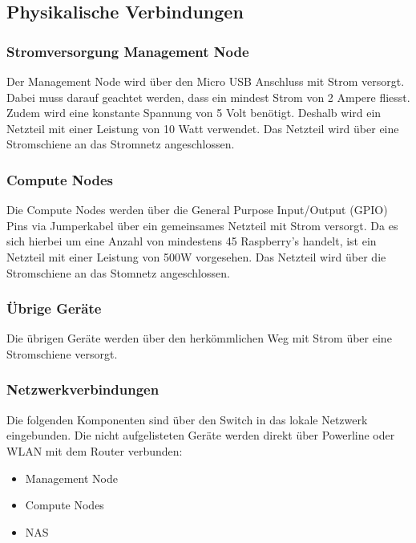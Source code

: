 \subsection{Physikalische Verbindungen}

\subsubsection{Stromversorgung Management Node}
Der Management Node wird über den Micro USB Anschluss mit Strom versorgt. Dabei muss darauf geachtet werden, dass ein mindest Strom von 2 Ampere fliesst. Zudem wird eine konstante Spannung von 5 Volt benötigt. Deshalb wird ein Netzteil mit einer Leistung von 10 Watt verwendet. Das Netzteil wird über eine Stromschiene an das Stromnetz angeschlossen.

\subsubsection{Compute Nodes}
Die Compute Nodes werden über die General Purpose Input/Output (GPIO) Pins via Jumperkabel über ein gemeinsames Netzteil mit Strom versorgt. Da es sich hierbei um eine Anzahl von mindestens 45 Raspberry's handelt, ist ein Netzteil mit einer Leistung von 500W vorgesehen. Das Netzteil wird über die Stromschiene an das Stomnetz angeschlossen.


\subsubsection{Übrige Geräte}
Die übrigen Geräte werden über den herkömmlichen Weg mit Strom über eine Stromschiene versorgt.

\subsubsection{Netzwerkverbindungen}
Die folgenden Komponenten sind über den Switch in das lokale Netzwerk eingebunden. Die nicht aufgelisteten Geräte werden direkt über Powerline oder WLAN mit dem Router verbunden:
\begin{itemize}
\item Management Node
\item Compute Nodes
\item NAS
\end{itemize}


